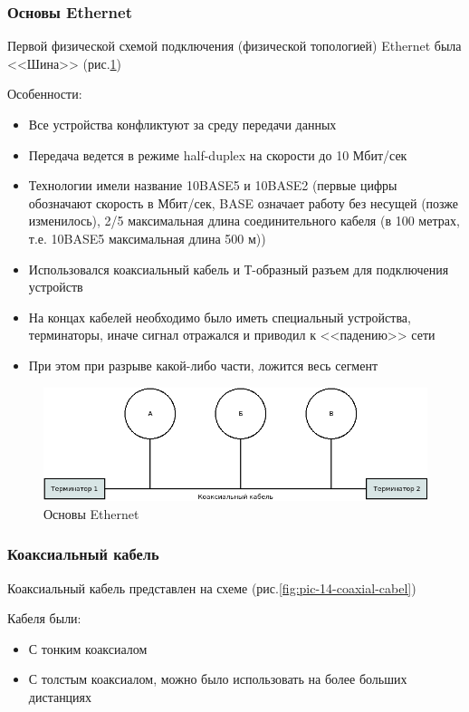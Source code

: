 \documentclass[a4paper]{article}
\begin{document}
\subsubsection{Основы Ethernet}
Первой физической схемой подключения (физической топологией) Ethernet была <<Шина>> (рис.\ref{fig:pic-13-tcpip-first-version})

Особенности:
\begin{itemize}
	\item Все устройства конфликтуют за среду передачи данных
	\item Передача ведется в режиме half-duplex на скорости до 10 Мбит/сек
	\item Технологии имели название 10BASE5 и 10BASE2 (первые цифры обозначают скорость в Мбит/сек, BASE означает работу без несущей (позже изменилось), 2/5 максимальная длина соединительного кабеля (в 100 метрах, т.е. 10BASE5 максимальная длина 500 м))
	\item Использовался коаксиальный кабель и Т-образный разъем для подключения устройств
	\item На концах кабелей необходимо было иметь специальный устройства, терминаторы, иначе сигнал отражался и приводил к <<падению>> сети
	\item При этом при разрыве какой-либо части, ложится весь сегмент
\end{itemize}

\begin{figure}[!h]
	\centering
	\includegraphics[width=15cm]{13-tcpip-first-version}
	\caption{Основы Ethernet}
	\label{fig:pic-13-tcpip-first-version}
\end{figure}

\subsubsection{Коаксиальный кабель}
Коаксиальный кабель представлен на схеме (рис.\ref{fig:pic-14-coaxial-cabel})

Кабеля были:
\begin{itemize}
	\item С тонким коаксиалом
	\item С толстым коаксиалом, можно было использовать на более больших дистанциях
\end{itemize}
\end{document}
